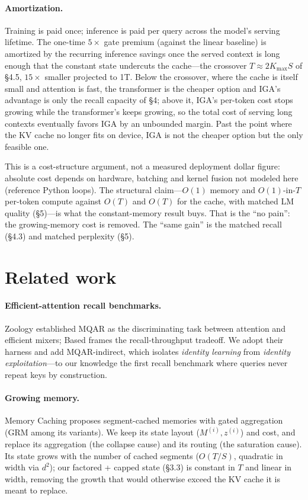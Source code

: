 \documentclass[11pt]{article}
\begin{document}
\paragraph{Amortization.} Training is paid once; inference is paid per query
across the model's serving lifetime. The one-time $5\times$ gate premium (against
the linear baseline) is amortized by the recurring inference savings once the
served context is long enough that the constant state undercuts the cache---the
crossover $T\approx 2K_{\max}S$ of \S4.5, $15\times$ smaller projected to 1T. Below
the crossover, where the cache is itself small and attention is fast, the
transformer is the cheaper option and IGA's advantage is only the recall capacity
of \S4; above it, IGA's per-token cost stops growing while the transformer's keeps
growing, so the total cost of serving long contexts eventually favors IGA by an
unbounded margin. Past the point where the KV cache no longer fits on device, IGA
is not the cheaper option but the only feasible one.

This is a cost-structure argument, not a measured deployment dollar figure:
absolute cost depends on hardware, batching and kernel fusion not modeled here
(reference Python loops). The structural claim---$O(1)$ memory and
$O(1)$-in-$T$ per-token compute against $O(T)$ and $O(T)$ for the cache, with
matched LM quality (\S5)---is what the constant-memory result buys. That is the
``no pain'': the growing-memory cost is removed. The ``same gain'' is the matched
recall (\S4.3) and matched perplexity (\S5).

\section{Related work}

\paragraph{Efficient-attention recall benchmarks.} Zoology
\citep{arora2023zoology} established MQAR as the discriminating task between
attention and efficient mixers; Based \citep{arora2024based} frames the
recall-throughput tradeoff. We adopt their harness and add MQAR-indirect, which
isolates \emph{identity learning} from \emph{identity exploitation}---to our
knowledge the first recall benchmark where queries never repeat keys by
construction.

\paragraph{Growing memory.} Memory Caching \citep{behrouz2026memorycaching}
proposes segment-cached memories with gated aggregation (GRM among its variants).
We keep its state layout ($M^{(i)}, z^{(i)}$) and cost, and replace its aggregation
(the collapse cause) and its routing (the saturation cause). Its state grows with
the number of cached segments ($O(T/S)$, quadratic in width via $d^2$); our
factored + capped state (\S3.3) is constant in $T$ and linear in width, removing
the growth that would otherwise exceed the KV cache it is meant to replace.
\end{document}
